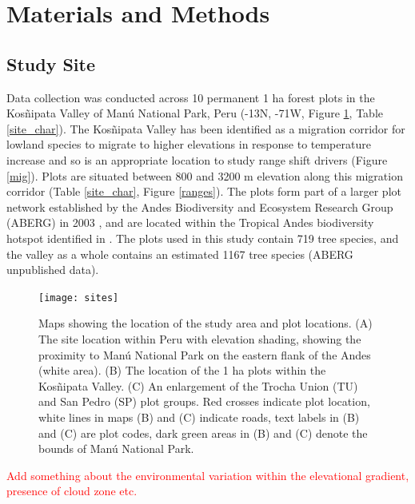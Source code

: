 \documentclass[a4paper, 11pt]{article}
\newcommand{\todo}[1]{\textcolor{red}{#1}}   %
\begin{document}
\section{Materials and Methods}
\subsection{Study Site}
Data collection was conducted across 10 permanent 1 ha forest plots in the Kos\~{n}ipata Valley of Man\'{u} National Park, Peru (-13\textdegree N, -71\textdegree W, Figure \ref{sites}, Table \ref{site_char}). The Kos\~{n}ipata Valley has been identified as a migration corridor for lowland species to migrate to higher elevations in response to temperature increase \citep{Feeley2011} and so is an appropriate location to study range shift drivers (Figure \ref{mig}). Plots are situated between 800 and 3200 m elevation along this migration corridor (Table \ref{site_char}, Figure \ref{ranges}). The plots form part of a larger plot network established by the Andes Biodiversity and Ecosystem Research Group (ABERG) in 2003 \citep{Malhi2010, Girardin2014}, and are located within the Tropical Andes biodiversity hotspot identified in \citet{Myers2000}. The plots used in this study contain 719 tree species, and the valley as a whole contains an estimated 1167 tree species (ABERG unpublished data).

\begin{figure}[H]
\texttt{[image: sites]}
\centering
\caption{Maps showing the location of the study area and plot locations. (A) The site location within Peru with elevation shading, showing the proximity to Man\'{u} National Park on the eastern flank of the Andes (white area). (B) The location of the 1 ha plots within the Kos\~{n}ipata Valley. (C) An enlargement of the Trocha Union (TU) and San Pedro (SP) plot groups. Red crosses indicate plot location, white lines in maps (B) and (C) indicate roads, text labels in (B) and (C) are plot codes, dark green areas in (B) and (C) denote the bounds of Man\'{u} National Park.}
\label{sites}
\end{figure}




\todo{Add something about the environmental variation within the elevational gradient, presence of cloud zone etc.}
\end{document}

